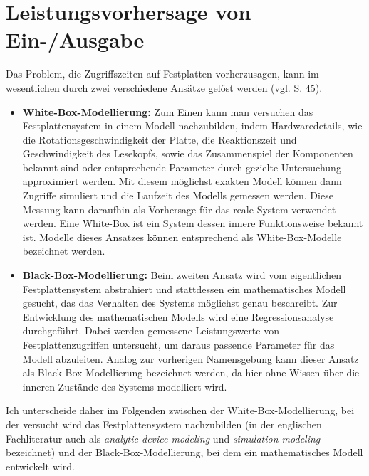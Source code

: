 \documentclass[
	twoside,
	12pt,
	a4paper,
	BCOR10mm,
	DIV14,
	listof=totoc,
	bibliography=totoc,
	headsepline
]{scrreprt}
\begin{document}
\section{Leistungsvorhersage von Ein-/Ausgabe}
\label{rel_ea-vorhersage}
Das Problem, die Zugriffszeiten auf Festplatten vorherzusagen, kann im wesentlichen durch zwei verschiedene Ansätze gelöst werden (vgl. \cite{Crume:2013:FML:2538542.2538561} S. 45).
\begin{itemize}
\item  \textbf{White-Box-Modellierung:} Zum Einen kann man versuchen das Festplattensystem in einem Modell nachzubilden, indem Hardwaredetails, wie die Rotationsgeschwindigkeit der Platte, die Reaktionszeit und Geschwindigkeit des Lesekopfs, sowie das Zusammenspiel der Komponenten bekannt sind oder entsprechende Parameter durch gezielte Untersuchung approximiert werden. Mit diesem möglichst exakten Modell können dann Zugriffe simuliert und die Laufzeit des Modells gemessen werden. Diese Messung kann daraufhin als Vorhersage für das reale System verwendet werden. Eine White-Box ist ein System dessen innere Funktionsweise bekannt ist. Modelle dieses Ansatzes können entsprechend als White-Box-Modelle bezeichnet werden.
\item \textbf{Black-Box-Modellierung:} Beim zweiten Ansatz wird vom eigentlichen Festplattensystem abstrahiert und stattdessen ein mathematisches Modell gesucht, das das Verhalten des Systems möglichst genau beschreibt.
Zur Entwicklung des mathematischen Modells wird eine Regressionsanalyse durchgeführt. Dabei werden gemessene Leistungswerte von Festplattenzugriffen untersucht, um daraus passende Parameter für das Modell abzuleiten. Analog zur vorherigen Namensgebung kann dieser Ansatz als Black-Box-Modellierung bezeichnet werden, da hier ohne Wissen über die inneren Zustände des Systems modelliert wird.
\end{itemize}
Ich unterscheide daher im Folgenden zwischen der White-Box-Modellierung, bei der versucht wird das Festplattensystem nachzubilden (in der englischen Fachliteratur auch als \textit{analytic device modeling} und \textit{simulation modeling} bezeichnet) und der Black-Box-Modellierung, bei dem ein mathematisches Modell entwickelt wird.
\end{document}
